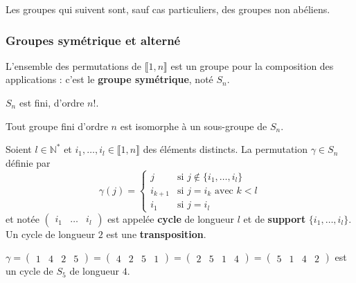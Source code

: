   Les groupes qui suivent sont, sauf cas particuliers, des groupes non abéliens.

  \subsubsection{Groupes symétrique et alterné}


  \begin{definition}
    L'ensemble des permutations de $\llbracket 1, n \rrbracket$ est un groupe pour la composition des applications : c'est le \textbf{groupe symétrique}, noté $S_n$.
  \end{definition}

  \begin{remark}
    $S_n$ est fini, d'ordre $n!$.
  \end{remark}

  \begin{theorem}
    Tout groupe fini d'ordre $n$ est isomorphe à un sous-groupe de $S_n$.
  \end{theorem}

  \begin{definition}
    Soient $l \in \mathbb{N}^*$ et $i_1, \dots, i_l \in \llbracket 1, n \rrbracket$ des éléments distincts. La permutation $\gamma \in S_n$ définie par
    \[
      \gamma(j) =
      \begin{cases}
        j &\text{si } j \notin \{ i_1, \dots, i_l \} \\
        i_{k+1} &\text{si } j = i_k \text{ avec } k<l \\
        i_1 &\text{si } j=i_l
      \end{cases}
    \]
    et notée $\begin{pmatrix} i_1 & \dots & i_l \end{pmatrix}$ est appelée \textbf{cycle} de longueur $l$ et de \textbf{support} $\{ i_1, \dots, i_l \}$. Un cycle de longueur $2$ est une \textbf{transposition}.
  \end{definition}

  \begin{example}
    $\gamma = \begin{pmatrix} 1 & 4 & 2 & 5 \end{pmatrix} = \begin{pmatrix} 4 & 2 & 5 & 1 \end{pmatrix} = \begin{pmatrix} 2 & 5 & 1 & 4 \end{pmatrix} = \begin{pmatrix} 5 & 1 & 4 & 2 \end{pmatrix}$ est un cycle de $S_5$ de longueur $4$.
  \end{example}

